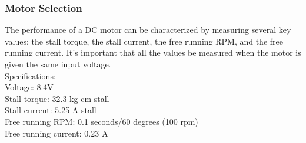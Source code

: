 
\subsubsection{Motor Selection}

The performance of a DC motor can be characterized by measuring several key values: the stall torque, the stall current, the free running RPM, and the free running current. It's important that all the values be measured when the motor is given the same input voltage.\\

\noindent
Specifications:\\
\noindent
\indent Voltage: 8.4V \\
\indent Stall torque: 32.3 kg cm stall \\
\indent Stall current: 5.25 A stall \\
\indent Free running RPM: 0.1 seconds/60 degrees (100 rpm) \\
\indent Free running current: 0.23 A \\





